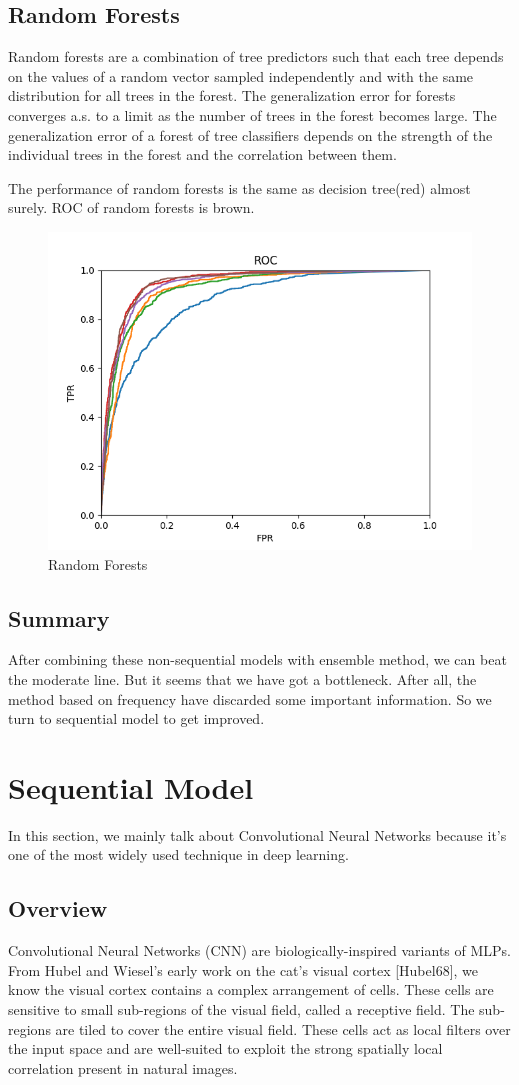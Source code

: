 \documentclass{article}
\begin{document}
\subsection{Random Forests}
\quad Random forests are a combination of tree predictors such that each tree depends on the values of a random vector sampled independently and with the same distribution for all trees in the forest. The generalization error for forests converges a.s. to a limit as the number of trees in the forest becomes large. The generalization error of a forest of tree classifiers depends on the strength of the individual trees in the forest and the correlation between them. 

The performance of random forests is the same as decision tree(red) almost surely. ROC of random forests is brown.
\begin{figure}[H]
\centering
\includegraphics[width=.4\textwidth]{RF.png}
\caption{Random Forests}
\end{figure}

\subsection{Summary}
\quad After combining these non-sequential models with ensemble method, we can beat the moderate line. But it seems that we have got a bottleneck. After all, the method based on frequency have discarded some important information. So we turn to sequential model to get improved.



\section{Sequential Model}
\quad In this section, we mainly talk about Convolutional Neural Networks because it's one of the most widely used technique in deep learning.

\subsection{Overview}
\quad Convolutional Neural Networks (CNN) are biologically-inspired variants of MLPs. From Hubel and Wiesel’s early work on the cat’s visual cortex [Hubel68], we know the visual cortex contains a complex arrangement of cells. These cells are sensitive to small sub-regions of the visual field, called a receptive field. The sub-regions are tiled to cover the entire visual field. These cells act as local filters over the input space and are well-suited to exploit the strong spatially local correlation present in natural images.
\end{document}
